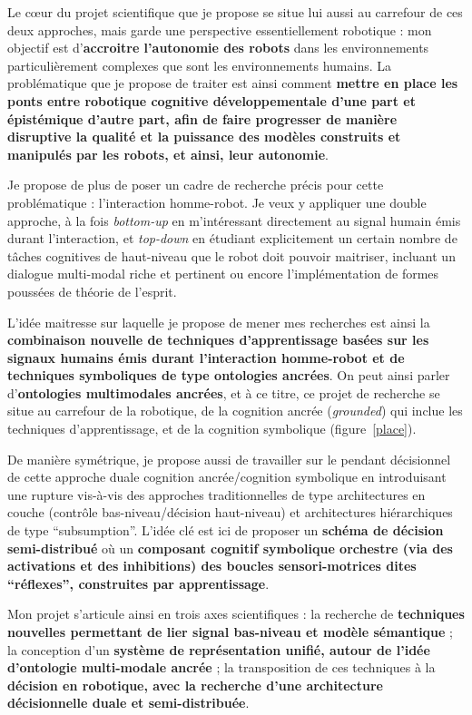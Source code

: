 \documentclass[a4paper]{article}
\begin{document}
Le c\oe ur du projet scientifique que je propose se situe lui aussi au carrefour
de ces deux approches, mais garde une perspective essentiellement robotique :
mon objectif est d'\textbf{accroitre l'autonomie des robots} dans les
environnements particulièrement complexes que sont les environnements humains.
La problématique que je propose de traiter est ainsi comment \textbf{mettre en
place les ponts entre robotique cognitive développementale d'une part et
épistémique d'autre part, afin de faire progresser de manière disruptive la
qualité et la puissance des modèles construits et manipulés par les robots, et
ainsi, leur autonomie}.

Je propose de plus de poser un cadre de recherche précis pour cette
problématique : l'interaction homme-robot. Je veux y appliquer une double
approche, à la fois \emph{bottom-up} en m'intéressant directement au
signal humain émis durant l'interaction, et \emph{top-down} en étudiant
explicitement un certain nombre de tâches cognitives de haut-niveau que le robot
doit pouvoir maitriser, incluant un dialogue multi-modal riche et pertinent ou
encore l'implémentation de formes poussées de théorie de l'esprit.

L'idée maitresse sur laquelle je propose de mener mes recherches est ainsi la
\textbf{combinaison nouvelle de techniques d'apprentissage basées sur les
signaux humains émis durant l'interaction homme-robot et de techniques
symboliques de type ontologies ancrées}. On peut ainsi parler
d'\textbf{ontologies multimodales ancrées}, et à ce titre, ce projet de
recherche se situe au carrefour de la robotique, de la cognition ancrée
(\emph{grounded}) qui inclue les techniques d'apprentissage, et de la cognition
symbolique (figure~\ref{place}).

De manière symétrique, je propose aussi de travailler sur le pendant décisionnel
de cette approche duale cognition ancrée/cognition symbolique en introduisant
une rupture vis-à-vis des approches traditionnelles de type architectures en
couche (contrôle bas-niveau/décision haut-niveau) et architectures
hiérarchiques de type ``subsumption''. L'idée clé est ici de proposer un
\textbf{schéma de décision semi-distribué} où un \textbf{composant cognitif
symbolique orchestre (via des activations et des inhibitions) des boucles
sensori-motrices dites ``réflexes'', construites par apprentissage}.

Mon projet s'articule ainsi en trois axes scientifiques : la recherche de
\textbf{techniques nouvelles permettant de lier signal bas-niveau et modèle
sémantique} ; la conception d'un \textbf{système de représentation unifié,
autour de l'idée d'ontologie multi-modale ancrée} ; la transposition de ces
techniques à la \textbf{décision en robotique, avec la recherche d'une
architecture décisionnelle duale et semi-distribuée}.
\end{document}
